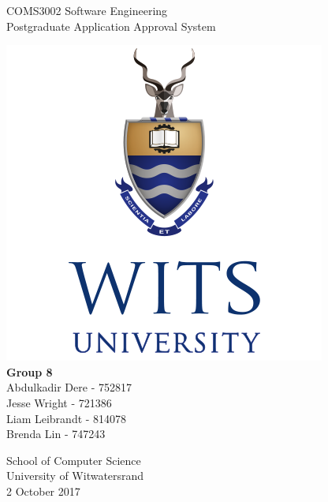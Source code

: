 \documentclass{article}
\begin{document}
\begin{titlepage}
    \begin{center}
        \vspace*{1cm}
        \huge COMS3002 Software Engineering \\
        \LARGE Postgraduate Application Approval System
        
		\vspace{1.5cm}        
		
		\includegraphics[scale=0.5]{witsLogo.png} \\		
		\vspace{1.5cm}
        \textbf{Group 8} \\
        \large Abdulkadir Dere - 752817\\
        Jesse Wright - 721386 \\
        Liam Leibrandt - 814078\\
        Brenda Lin - 747243 \\
        
		\vspace{1.5cm} 
		       
                
        School of Computer Science\\
        University of Witwatersrand\\
        2 October 2017
        
    \end{center}
\end{titlepage}

\tableofcontents

\pagebreak
\end{document}
